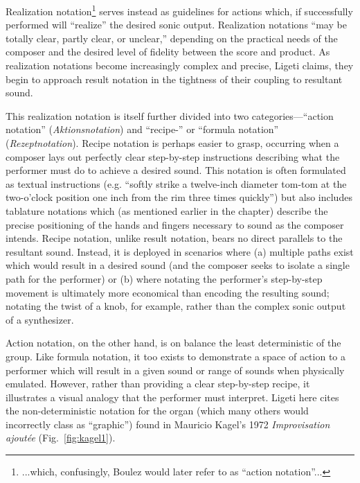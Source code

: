 
    Realization notation\footnote{...which, confusingly, Boulez would later refer to as ``action notation''...} serves instead as guidelines for actions which, if successfully performed will ``realize'' the desired sonic output. Realization notations ``may be totally clear, partly clear, or unclear,'' depending on the practical needs of the composer and the desired level of fidelity between the score and product. As realization notations become increasingly complex and precise, Ligeti claims, they begin to approach result notation in the tightness of their coupling to resultant sound.\autocite[pg. 178 in Ernst et al., 1965.]{Ligeti_forthcoming}

    This realization notation is itself further divided into two categories---``action notation'' (\textit{Aktionsnotation}) and ``recipe-'' or ``formula notation'' (\textit{Rezeptnotation}). Recipe notation is perhaps easier to grasp, occurring when a composer lays out perfectly clear step-by-step instructions describing what the performer must do to achieve a desired sound. This notation is often formulated as textual instructions (e.g. ``softly strike a twelve-inch diameter tom-tom at the two-o'clock position one inch from the rim three times quickly'') but also includes tablature notations which (as mentioned earlier in the chapter) describe the precise positioning of the hands and fingers necessary to sound as the composer intends. Recipe notation, unlike result notation, bears no direct parallels to the resultant sound. Instead, it is deployed in scenarios where (a) multiple paths exist which would result in a desired sound (and the composer seeks to isolate a single path for the performer) or (b) where notating the performer's step-by-step movement is ultimately more economical than encoding the resulting sound; notating the twist of a knob, for example, rather than the complex sonic output of a synthesizer.

    Action notation, on the other hand, is on balance the least deterministic of the group. Like formula notation, it too exists to demonstrate a space of action to a performer which will result in a given sound or range of sounds when physically emulated. However, rather than providing a clear step-by-step recipe, it illustrates a visual analogy that the performer must interpret. Ligeti here cites the non-deterministic notation for the organ (which many others would incorrectly class as ``graphic'') found in Mauricio Kagel's 1972 \textit{Improvisation ajoutée} (Fig.~\ref{fig:kagel1}). 

